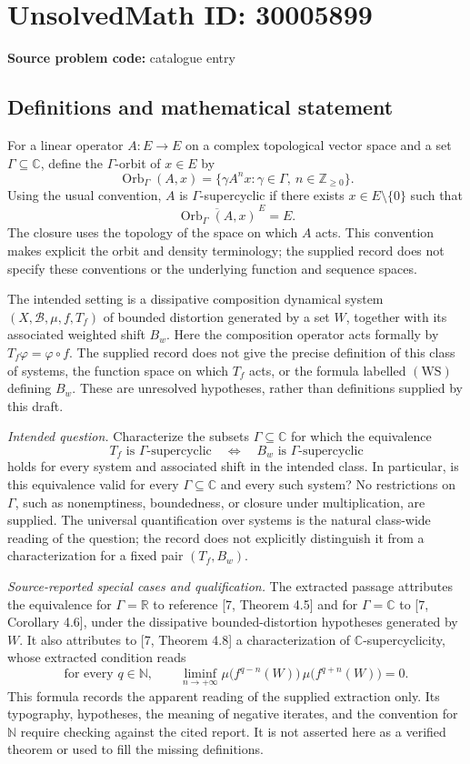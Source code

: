 \documentclass[11pt]{article}
\newcommand{\N}{\mathbb{N}}
\newcommand{\Z}{\mathbb{Z}}
\newcommand{\R}{\mathbb{R}}
\newcommand{\C}{\mathbb{C}}
\begin{document}
\section*{UnsolvedMath ID: 30005899}
\textbf{Source problem code:} catalogue entry
\subsection{Definitions and mathematical statement}
For a linear operator \(A:E\to E\) on a complex topological vector space and a set \(\Gamma\subseteq\C\), define the \(\Gamma\)-orbit of \(x\in E\) by
\[
\operatorname{Orb}_{\Gamma}(A,x)=\{\gamma A^n x:\gamma\in\Gamma,\ n\in\Z_{\geq 0}\}.
\]
Using the usual convention, \(A\) is \(\Gamma\)-supercyclic if there exists \(x\in E\setminus\{0\}\) such that
\[
\overline{\operatorname{Orb}_{\Gamma}(A,x)}^{\,E}=E.
\]
The closure uses the topology of the space on which \(A\) acts. This convention makes explicit the orbit and density terminology; the supplied record does not specify these conventions or the underlying function and sequence spaces.

The intended setting is a dissipative composition dynamical system \((X,\mathcal B,\mu,f,T_f)\) of bounded distortion generated by a set \(W\), together with its associated weighted shift \(B_w\). Here the composition operator acts formally by \(T_f\varphi=\varphi\circ f\). The supplied record does not give the precise definition of this class of systems, the function space on which \(T_f\) acts, or the formula labelled \((\mathrm{WS})\) defining \(B_w\). These are unresolved hypotheses, rather than definitions supplied by this draft.

\emph{Intended question.} Characterize the subsets \(\Gamma\subseteq\C\) for which the equivalence
\[
T_f\text{ is }\Gamma\text{-supercyclic}
\quad\Longleftrightarrow\quad
B_w\text{ is }\Gamma\text{-supercyclic}
\]
holds for every system and associated shift in the intended class. In particular, is this equivalence valid for every \(\Gamma\subseteq\C\) and every such system? No restrictions on \(\Gamma\), such as nonemptiness, boundedness, or closure under multiplication, are supplied. The universal quantification over systems is the natural class-wide reading of the question; the record does not explicitly distinguish it from a characterization for a fixed pair \((T_f,B_w)\).

\emph{Source-reported special cases and qualification.} The extracted passage attributes the equivalence for \(\Gamma=\R\) to reference [7, Theorem 4.5] and for \(\Gamma=\C\) to [7, Corollary 4.6], under the dissipative bounded-distortion hypotheses generated by \(W\). It also attributes to [7, Theorem 4.8] a characterization of \(\C\)-supercyclicity, whose extracted condition reads
\[
\text{for every }q\in\N,\qquad
\liminf_{n\to+\infty}
\mu\bigl(f^{q-n}(W)\bigr)\,
\mu\bigl(f^{q+n}(W)\bigr)=0.
\]
This formula records the apparent reading of the supplied extraction only. Its typography, hypotheses, the meaning of negative iterates, and the convention for \(\N\) require checking against the cited report. It is not asserted here as a verified theorem or used to fill the missing definitions.
\end{document}
